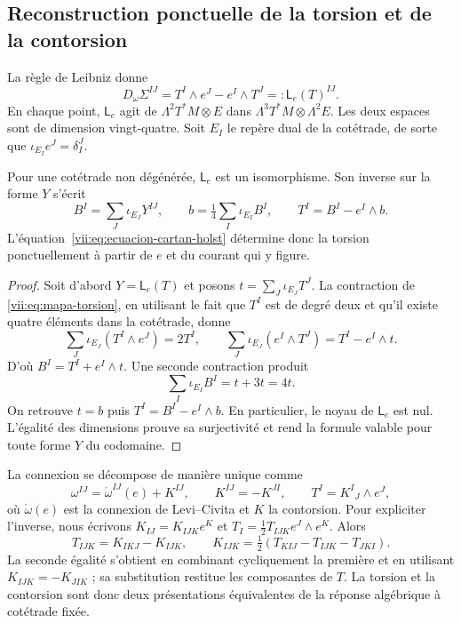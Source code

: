 \subsection{Reconstruction ponctuelle de la torsion et de la contorsion}
\label{vii:subsec:reconstruccion-torsion}

La règle de Leibniz donne
\begin{equation}
 D_\omega\Sigma^{IJ}
 =T^I\wedge e^J-e^I\wedge T^J
 =:\mathsf L_e(T)^{IJ}.
 \label{vii:eq:mapa-torsion}
\end{equation}
En chaque point, \(\mathsf L_e\) agit de \(\Lambda^2T^*M\otimes E\) dans \(\Lambda^3T^*M\otimes\Lambda^2E\). Les deux espaces sont de dimension vingt-quatre. Soit \(E_I\) le repère dual de la cotétrade, de sorte que \(\iota_{E_I}e^J=\delta_I^J\).

\begin{theorem}
\label{vii:thm:inversion-torsion}
Pour une cotétrade non dégénérée, \(\mathsf L_e\) est un isomorphisme.
Son inverse sur la forme \(Y\) s'écrit
\begin{equation}
 B^I=\sum_J\iota_{E_J}Y^{IJ},\qquad
 b=\tfrac14\sum_I\iota_{E_I}B^I,\qquad
 T^I=B^I-e^I\wedge b.
 \label{vii:eq:torsion-explicita}
\end{equation}
L'équation~\eqref{vii:eq:ecuacion-cartan-holst} détermine donc
la torsion ponctuellement à partir de \(e\) et du courant qui y
figure.
\end{theorem}
\begin{proof}
Soit d'abord \(Y=\mathsf L_e(T)\) et posons
\(t=\sum_J\iota_{E_J}T^J\). La contraction de
\eqref{vii:eq:mapa-torsion}, en utilisant le fait que \(T^I\) est de degré deux
et qu'il existe quatre éléments dans la cotétrade, donne
\[
 \sum_J\iota_{E_J}(T^I\wedge e^J)=2T^I,
 \qquad
 \sum_J\iota_{E_J}(e^I\wedge T^J)=T^I-e^I\wedge t.
\]
D'où \(B^I=T^I+e^I\wedge t\). Une seconde contraction produit
\[
 \sum_I\iota_{E_I}B^I=t+3t=4t.
\]
On retrouve \(t=b\) puis \(T^I=B^I-e^I\wedge b\).
En particulier, le noyau de \(\mathsf L_e\) est nul. L'égalité
des dimensions prouve sa surjectivité et rend la formule valable
pour toute forme \(Y\) du codomaine.
\end{proof}

La connexion se décompose de manière unique comme
\begin{equation}
 \omega^{IJ}=\mathring\omega^{IJ}(e)+K^{IJ},\qquad
 K^{IJ}=-K^{JI},\qquad T^I=K^I{}_{J}\wedge e^J,
 \label{vii:eq:contorsion}
\end{equation}
où \(\mathring\omega(e)\) est la connexion de Levi--Civita et \(K\) la contorsion. Pour expliciter l'inverse, nous écrivons \(K_{IJ}=K_{IJK}e^K\) et \(T_I=\tfrac12T_{IJK}e^J\wedge e^K\). Alors
\begin{equation}
 T_{IJK}=K_{IKJ}-K_{IJK},\qquad
 K_{IJK}=\tfrac12(T_{KIJ}-T_{IJK}-T_{JKI}).
 \label{vii:eq:contorsion-componentes}
\end{equation}
La seconde égalité s'obtient en combinant cycliquement la première et
en utilisant \(K_{IJK}=-K_{JIK}\) ; sa substitution restitue les composantes
de \(T\). La torsion et la contorsion sont donc deux
présentations équivalentes de la réponse algébrique à cotétrade fixée.

